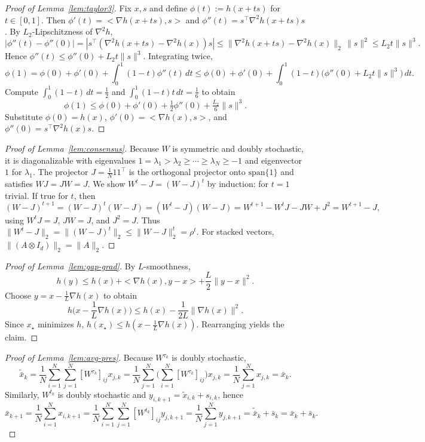 \documentclass[11pt,a4paper]{article}
\def\one{1}%
\def\J{J}%
\def\ip#1#2{<#1,#2>}%
\newcommand{\one}{\mathbf{1}}
\newcommand{\ip}[2]{\left\langle #1,#2\right\rangle}
\newcommand{\J}{\left(\frac{1}{N}\one\one^\top\right)}
\begin{document}
\begin{proof}[Proof of Lemma~\ref{lem:taylor3}]
Fix $x,s$ and define $\phi(t):=h(x+ts)$ for $t\in[0,1]$.
Then $\phi'(t)=\ip{\nabla h(x+ts)}{s}$ and $\phi''(t)=s^\top\nabla^2 h(x+ts)s$.
By $L_2$-Lipschitzness of $\nabla^2 h$,
\[
|\phi''(t)-\phi''(0)|
=|s^\top(\nabla^2 h(x+ts)-\nabla^2 h(x))s|
\le \|\nabla^2 h(x+ts)-\nabla^2 h(x)\|_2\,\|s\|^2
\le L_2 t\|s\|^3.
\]
Hence $\phi''(t)\le \phi''(0)+L_2 t\|s\|^3$.
Integrating twice,
\[
\phi(1)=\phi(0)+\phi'(0)+\int_0^1(1-t)\phi''(t)\,dt
\le \phi(0)+\phi'(0)+\int_0^1(1-t)\big(\phi''(0)+L_2 t\|s\|^3\big)\,dt.
\]
Compute $\int_0^1(1-t)\,dt=\tfrac12$ and $\int_0^1(1-t)t\,dt=\tfrac16$ to obtain
\[
\phi(1)\le \phi(0)+\phi'(0)+\tfrac12\phi''(0)+\tfrac{L_2}{6}\|s\|^3.
\]
Substitute $\phi(0)=h(x)$, $\phi'(0)=\ip{\nabla h(x)}{s}$, and $\phi''(0)=s^\top\nabla^2 h(x)s$.
\end{proof}

\begin{proof}[Proof of Lemma~\ref{lem:consensus}]
Because $W$ is symmetric and doubly stochastic, it is diagonalizable with eigenvalues
$1=\lambda_1>\lambda_2\ge\cdots\ge\lambda_N\ge -1$ and eigenvector $\one$ for $\lambda_1$.
The projector $\J=\frac1N\one\one^\top$ is the orthogonal projector onto $\mathrm{span}\{\one\}$ and satisfies $W\J=\J W=\J$.
We show $W^t-\J=(W-\J)^t$ by induction: for $t=1$ trivial. If true for $t$, then
\[
(W-\J)^{t+1}=(W-\J)^t(W-\J)=(W^t-\J)(W-\J)=W^{t+1}-W^t\J-\J W+\J^2=W^{t+1}-\J,
\]
using $W^t\J=\J$, $\J W=\J$, and $\J^2=\J$.
Thus $\|W^t-\J\|_2=\|(W-\J)^t\|_2\le \|W-\J\|_2^t=\rho^t$.
For stacked vectors, $\|(A\otimes I_d)\|_2=\|A\|_2$.
\end{proof}

\begin{proof}[Proof of Lemma~\ref{lem:gap-grad}]
By $L$-smoothness,
\[
h(y)\le h(x)+\ip{\nabla h(x)}{y-x}+\frac{L}{2}\|y-x\|^2.
\]
Choose $y=x-\frac1L\nabla h(x)$ to obtain
\[
h\Big(x-\frac1L\nabla h(x)\Big)\le h(x)-\frac{1}{2L}\|\nabla h(x)\|^2.
\]
Since $x_\star$ minimizes $h$, $h(x_\star)\le h(x-\frac1L\nabla h(x))$. Rearranging yields the claim.
\end{proof}

\begin{proof}[Proof of Lemma~\ref{lem:avg-pres}]
Because $W^{\tau_k}$ is doubly stochastic,
\[
\tilde{\bar x}_k=\frac1N\sum_{i=1}^N\sum_{j=1}^N [W^{\tau_k}]_{ij}x_{j,k}
=\frac1N\sum_{j=1}^N\Big(\sum_{i=1}^N [W^{\tau_k}]_{ij}\Big)x_{j,k}
=\frac1N\sum_{j=1}^N x_{j,k}=\bar x_k.
\]
Similarly, $W^{t_k}$ is doubly stochastic and $y_{i,k+1}=\tilde x_{i,k}+s_{i,k}$, hence
\[
\bar x_{k+1}
=\frac1N\sum_{i=1}^N x_{i,k+1}
=\frac1N\sum_{i=1}^N\sum_{j=1}^N [W^{t_k}]_{ij}y_{j,k+1}
=\frac1N\sum_{j=1}^N y_{j,k+1}
=\tilde{\bar x}_k+\bar s_k=\bar x_k+\bar s_k.
\]
\end{proof}
\end{document}
